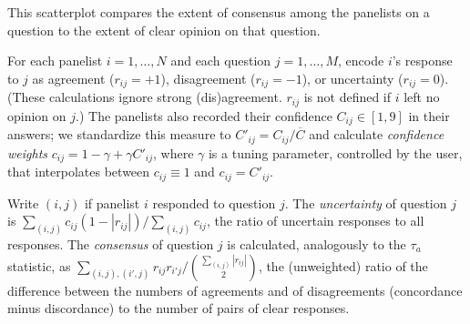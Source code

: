 \documentclass{article}
\begin{document}
This scatterplot compares the extent of consensus among the panelists on a question to the extent of clear opinion on that question.

For each panelist \(i=1,\ldots,N\) and each question \(j=1,\ldots,M\), encode \(i\)'s response to \(j\) as agreement (\(r_{ij}=+1\)), disagreement (\(r_{ij}=-1\)), or uncertainty (\(r_{ij}=0\)). (These calculations ignore strong (dis)agreement. \(r_{ij}\) is not defined if \(i\) left no opinion on \(j\).) The panelists also recorded their confidence \(C_{ij}\in[1,9]\) in their answers; we standardize this measure to \(C'_{ij}=C_{ij}/\overline{C}\) and calculate {\em confidence weights} \(c_{ij}=1-\gamma+\gamma C'_{ij}\), where \(\gamma\) is a tuning parameter, controlled by the user, that interpolates between \(c_{ij}\equiv 1\) and \(c_{ij}=C'_{ij}\).

Write \((i,j)\) if panelist \(i\) responded to question \(j\). The {\em uncertainty} of question \(j\) is \(\sum_{(i,j)}{c_{ij}(1-|r_{ij}|)}/\sum_{(i,j)}{c_{ij}}\), the ratio of uncertain responses to all responses. The {\em consensus} of question \(j\) is calculated, analogously to the \(\tau_a\) statistic, as \(\sum_{(i,j),(i',j)}{r_{ij}r_{i'j}}/{{\sum_{(i,j)}{|r_{ij}|}}\choose{2}}\), the (unweighted) ratio of the difference between the numbers of agreements and of disagreements (concordance minus discordance) to the number of pairs of clear responses.
\end{document}
